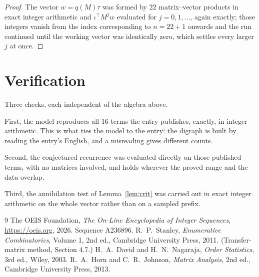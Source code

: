 \documentclass[11pt,a4paper]{article}
\theoremstyle{plain}
\theoremstyle{definition}
\begin{document}
\begin{proof}
The vector $w=q(M)\tau$ was formed by $22$ matrix--vector products in exact integer
arithmetic and $\iota^{\!\top}M^{j}w$ evaluated for $j=0,1,\dots$, again exactly; those
integers vanish from the index corresponding to $n=22+1$ onwards and the run continued
until the working vector was identically zero, which settles every larger $j$ at once.
\end{proof}

\section{Verification}

Three checks, each independent of the algebra above.

First, the model reproduces all $16$ terms the entry publishes, exactly, in integer
arithmetic. This is what ties the model to the entry: the digraph is built by reading the
entry's English, and a misreading gives different counts.

Second, the conjectured recurrence was evaluated directly on those published terms, with no
matrices involved, and holds wherever the proved range and the data overlap.

Third, the annihilation test of Lemma~\ref{lem:crit} was carried out in exact integer
arithmetic on the whole vector rather than on a sampled prefix.

\begin{thebibliography}{9}
 The OEIS Foundation, \emph{The On-Line Encyclopedia of Integer
Sequences}, \url{https://oeis.org}, 2026. Sequence A236896.
 R.~P.~Stanley, \emph{Enumerative Combinatorics}, Volume 1, 2nd ed.,
Cambridge University Press, 2011. (Transfer-matrix method, Section 4.7.)
 H.~A.~David and H.~N.~Nagaraja, \emph{Order Statistics}, 3rd ed., Wiley,
2003.
 R.~A.~Horn and C.~R.~Johnson, \emph{Matrix Analysis}, 2nd ed., Cambridge
University Press, 2013.
\end{thebibliography}
\end{document}

